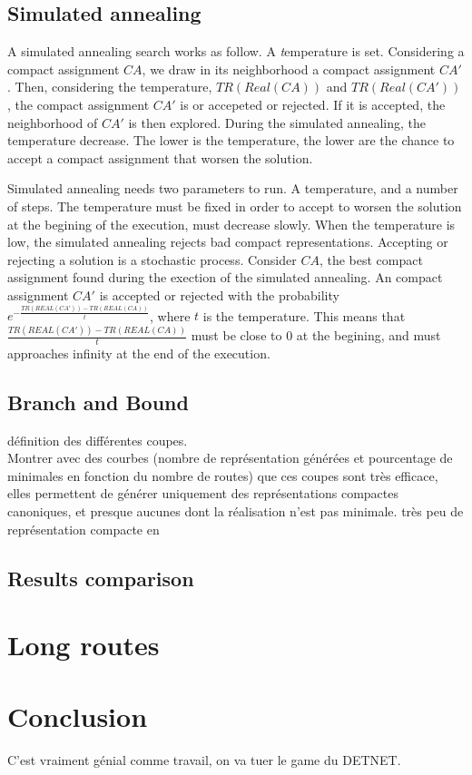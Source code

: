 \documentclass[english]{article}
\begin{document}
\subsection{Simulated annealing}

A simulated annealing search works as follow. A {\emph temperature} is set. Considering a compact assignment $CA$, we draw in its neighborhood a compact assignment $CA'$. Then, considering the temperature, $TR(Real(CA))$ and $TR(Real(CA'))$, the compact assignment $CA'$ is or accepeted or rejected. If it is accepted, the neighborhood of $CA'$ is then explored. During the simulated annealing, the temperature decrease. The lower is the temperature, the lower are the chance to accept a compact assignment that worsen the solution.

 Simulated annealing needs two parameters to run. A temperature, and a number of steps.
 The temperature must be fixed in order to accept to worsen the solution at the begining of the execution, must decrease slowly. When the temperature is low, the simulated annealing rejects bad compact representations.
 Accepting or rejecting a solution is a stochastic process. Consider $CA$, the best compact assignment found during the exection of the simulated annealing. An compact assignment $CA'$ is accepted or rejected with the probability $e^{-\frac{TR(REAL(CA'))-TR(REAL(CA))}{t}} $, where $t$ is the temperature.
 This means that $\frac{TR(REAL(CA'))-TR(REAL(CA))}{t}$ must be close to $0$ at the begining, and must approaches infinity at the end of the execution. 
\subsection{Branch and Bound}


définition des différentes coupes.\\
Montrer avec des courbes (nombre de représentation générées et pourcentage de minimales en fonction du nombre de routes) que ces coupes sont très efficace, elles permettent de générer uniquement des représentations compactes canoniques, et presque aucunes dont la réalisation n'est pas minimale.
très peu de représentation compacte en  

\subsection{Results comparison}
\section{Long routes}

\section{Conclusion}
C'est vraiment génial comme travail, on va tuer le game du DETNET.



\end{document}
